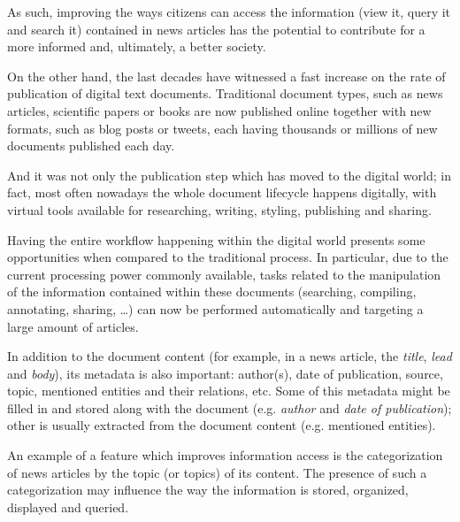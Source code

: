 \documentclass[conference]{IEEEtran}
\begin{document}
As such, improving the ways citizens can access the information (view
it, query it and search it) contained in news articles has the
potential to contribute for a more informed and, ultimately, a
better society\cite{bollinger1988tolerant}.

On the other hand, the last decades have witnessed a fast increase on
the rate of publication of digital text documents. Traditional
document types, such as news articles, scientific papers or books are
now published online together with new formats, such as blog posts or
tweets, each having thousands or millions of new documents published
each day\cite{hilbert2011world,allan2006online}.

And it was not only the publication step which has moved to the
digital world; in fact, most often nowadays the whole document
lifecycle happens digitally, with virtual tools available for
researching, writing, styling, publishing and sharing\cite{williams2009personal}.

Having the entire workflow happening within the digital world presents
some opportunities when compared to the traditional
process\cite{o1997comparison}. In particular, due to the current
processing power commonly available, tasks related to the manipulation
of the information contained within these documents (searching,
compiling, annotating, sharing, \dots) can now be performed
automatically and targeting a large amount of articles.

In addition to the document content (for example, in a news article,
the \emph{title}, \emph{lead} and \emph{body}), its metadata is also
important: author(s), date of publication, source, topic, mentioned
entities and their relations, etc\cite{yaginuma2003metadata,yaginuma2003design}. Some of
this metadata might be filled in and stored along with the document
(e.g. \emph{author} and \emph{date of publication}); other is usually
extracted from the document content (e.g. mentioned
entities)\cite{vadrevu2005automated}.

An example of a feature which improves information access is the
categorization of news articles by the topic (or topics) of its
content\cite{kim2006extracting}. The presence of such a categorization
may influence the way the information is stored, organized, displayed
and queried\cite{teitler2008newsstand}.
\end{document}
